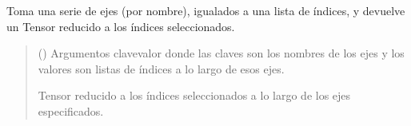 \documentclass[letterpaper,10pt,english]{sphinxmanual}
\begin{document}
\begin{fulllineitems}
\begin{fulllineitems}
\label{\detokenize{utils.tensor:utils.tensor.Tensor.take}}
\pysigstartsignatures
{}
\pysigstopsignatures
\sphinxAtStartPar
Toma una serie de ejes (por nombre), igualados a una lista de índices, y devuelve un Tensor
reducido a los índices seleccionados.
\begin{quote}\begin{description}
\sphinxAtStartPar
{} () \textendash{} Argumentos clave\sphinxhyphen{}valor donde las claves son los nombres de los ejes y los valores
son listas de índices a lo largo de esos ejes.

\sphinxAtStartPar
Tensor reducido a los índices seleccionados a lo largo de los ejes especificados.

\sphinxAtStartPar
{\hyperref[\detokenize{utils.tensor:utils.tensor.Tensor}]{}}

\end{description}\end{quote}

\end{fulllineitems}


\end{fulllineitems}

\end{document}
